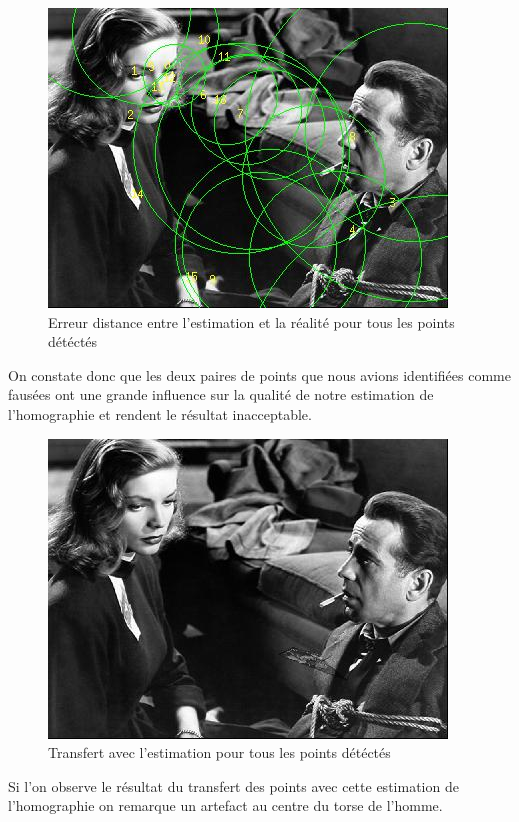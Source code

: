 \documentclass[12pt]{report}
\begin{document}
\begin{figure}[H]
\begin{center}
\includegraphics[scale=0.6]{Images/result_dlt_tp4.jpg}
\caption{Erreur distance entre l'estimation et la réalité pour tous les points détéctés}
\end{center}
\end{figure}

On constate donc que les deux paires de points que nous avions identifiées comme fausées ont une grande influence sur la qualité de notre estimation de l'homographie et rendent le résultat inacceptable.

\begin{figure}[H]
\begin{center}
\includegraphics[scale=0.6]{Images/transfer_result_dlt_tp4.jpg}
\caption{Transfert avec l'estimation pour tous les points détéctés}
\end{center}
\end{figure}

Si l'on observe le résultat du transfert des points avec cette estimation de l'homographie on remarque un artefact au centre du torse de l'homme.
\end{document}
